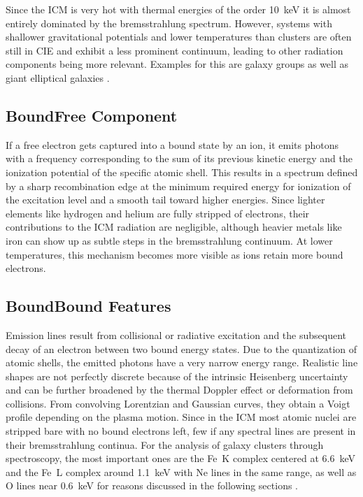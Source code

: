 Since the ICM is very hot with thermal energies of the order \qty{10}{\kilo\electronvolt} it is almost entirely
dominated by the bremsstrahlung spectrum. However, systems with shallower gravitational potentials and lower
temperatures than clusters are often still in CIE and exhibit a less prominent continuum, leading to other radiation
components being more relevant. Examples for this are galaxy groups as well as giant elliptical galaxies \cite{boeh2010}.


\subsection{Bound{\hspace{0.03em}\dash}Free Component}

If a free electron gets captured into a bound state by an ion, it emits photons with a frequency corresponding to the sum of
its previous kinetic energy and the ionization potential of the specific atomic shell. This results in a spectrum
defined by a sharp recombination edge at the minimum required energy for ionization of the excitation level and a
smooth tail toward higher energies. Since lighter elements like hydrogen and helium are fully stripped of electrons,
their contributions to the ICM radiation are negligible, although heavier metals like iron can show up as subtle steps in the
bremsstrahlung continuum. At lower temperatures, this mechanism becomes more visible as ions retain more bound electrons.


\subsection{Bound{\hspace{0.03em}\dash}Bound Features}
\vspace{-0.125\baselineskip}

Emission lines result from collisional or radiative excitation and the subsequent decay of an electron between two bound energy
states. Due to the quantization of atomic shells, the emitted photons have a very narrow energy range. Realistic line shapes are
not perfectly discrete because of the intrinsic Heisenberg uncertainty and can be further broadened by the thermal Doppler effect
or deformation from collisions. From convolving Lorentzian and Gaussian curves, they obtain a Voigt profile depending on the plasma
motion. Since in the ICM most atomic nuclei are stripped bare with no bound electrons left, few if any spectral lines are present
in their bremsstrahlung continua. For the analysis of galaxy clusters through \xray spectroscopy, the most important ones are the
Fe~K complex centered at \qty{6.6}{\kilo\electronvolt} and the Fe~L complex around \qty{1.1}{\kilo\electronvolt} with Ne lines in
the same range, as well as O lines near \qty{0.6}{\kilo\electronvolt} for reasons discussed in the following sections
\cite{rybi1979, kaas2008, boeh2010}.

